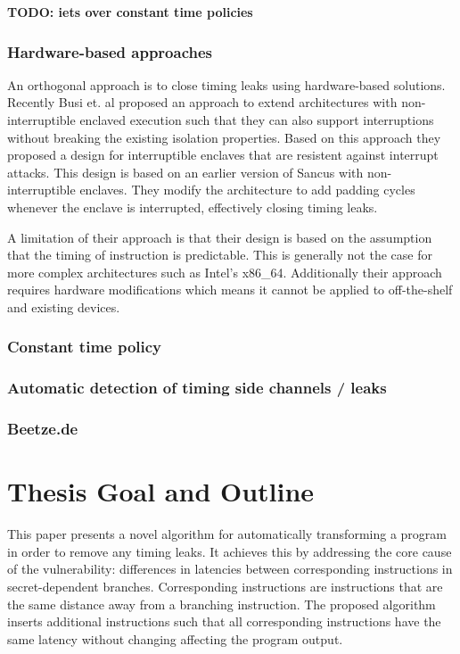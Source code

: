 \textbf{TODO: iets over constant time policies}
 

\subsubsection{Hardware-based approaches}
An orthogonal approach is to close timing leaks using hardware-based solutions. 
Recently Busi et. al \cite{busi} proposed an approach to extend architectures with non-interruptible enclaved execution such that they can also support interruptions without breaking 
the existing isolation properties. Based on this approach they proposed  a design for interruptible enclaves that are resistent against interrupt attacks. 
This design is based on an earlier version of Sancus with non-interruptible enclaves. They modify the architecture to add padding cycles whenever the enclave is interrupted, effectively closing timing leaks. 

A limitation of their approach is that their design is based on the assumption that the timing of instruction is predictable. This is generally not the case for more complex architectures such as Intel's x86\_64.
Additionally their approach requires hardware modifications which means it cannot be applied to off-the-shelf and existing devices. 



\subsubsection{Constant time policy}


\subsubsection{Automatic detection of timing side channels / leaks}


\subsubsection{Beetze.de}
	
\section{Thesis Goal and Outline}
This paper presents a novel algorithm for automatically transforming a program in order to remove any timing leaks. It achieves this by addressing the core cause of the vulnerability: differences in 
latencies between corresponding instructions in secret-dependent branches. Corresponding instructions are instructions that are the same distance away from a branching instruction. 
The proposed algorithm inserts additional instructions such that all corresponding instructions have the same latency without changing affecting the program output. 

